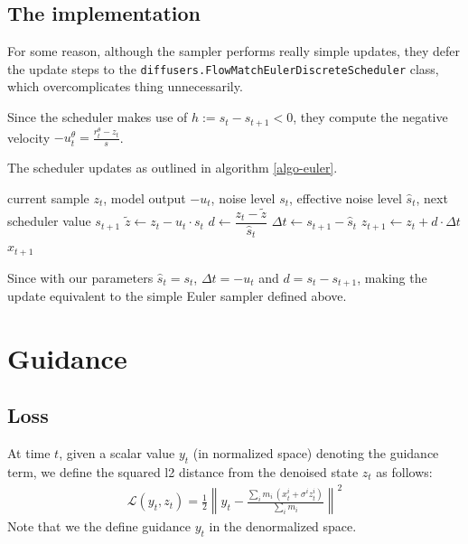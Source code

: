 \documentclass[a4paper,12pt]{article}
\begin{document}
\subsection{The implementation}
For some reason, although the sampler performs really simple updates, they defer the update steps to the \texttt{diffusers.FlowMatchEulerDiscreteScheduler} class, which overcomplicates thing unnecessarily.

Since the scheduler makes use of $h:=s_t-s_{t+1} < 0$, they compute the negative velocity $-u_t^\theta=\frac{r_{t}^\theta-z_{t}}{s}$.

The scheduler updates as outlined in algorithm \ref{algo-euler}.
\begin{algorithm}
\caption{Update}
\begin{algorithmic}[1]
\Require current sample $z_t$, model output $-u_t$, noise level $s_t$, effective noise level $\hat{s}_t$, next scheduler value $s_{t+1}$
\State $\tilde{z} \gets z_t - u_t \cdot s_t$
\State $d \gets \dfrac{z_t - \tilde{z}}{\hat{s}_t}$
\State $\Delta t \gets s_{t+1} - \hat{s}_t$
\State $z_{t+1} \gets z_t + d \cdot \Delta t$
\State \Return $x_{t+1}$
\end{algorithmic}
\label{algo-euler}
\end{algorithm}

Since with our parameters $\hat{s}_t=s_t$, $\Delta t=-u_t$ and $d=s_t-s_{t+1}$, making the update equivalent to the simple Euler sampler defined above. 

\section{Guidance}

\subsection{Loss}
At time $t$, given a scalar value $y_t$ (in normalized space) denoting the guidance term, we define the squared l2 distance from the denoised state $z_t$ as follows:
\begin{align*} 
    \mathcal{L}(y_t, z_t) = \frac{1}{2} \left\lVert y_t - \frac{\sum_i m_i \, (x_t^i + \sigma^i z_t^i)}{\sum_i m_i}   \right\lVert ^2
\end{align*}
Note that we the define guidance $y_t$ in the denormalized space.
\end{document}
